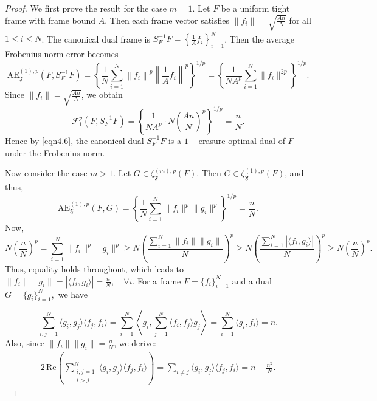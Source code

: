 \documentclass[10pt,a4paper]{amsart}
\begin{document}
   \begin{proof}
We first prove the result for the case \( m = 1 \). Let \( F \) be a uniform tight frame with frame bound \( A \). Then each frame vector satisfies \( \|f_i\| = \sqrt{\frac{An}{N}} \) for all \( 1 \leq i \leq N \). The canonical dual frame is \( S_F^{-1}F = \left\{ \frac{1}{A}f_i \right\}_{i=1}^N \). Then the average Frobenius-norm error becomes
\[
\mathrm{AE}_{\mathfrak{F}}^{(1),p}(F, S_F^{-1}F) = \left\{ \frac{1}{N} \sum_{i=1}^N \left\|f_i\right\|^p \left\|\frac{1}{A} f_i \right\|^p \right\}^{1/p} = \left\{ \frac{1}{N A^p} \sum_{i=1}^N \|f_i\|^{2p} \right\}^{1/p}.
\]
Since \( \|f_i\| = \sqrt{\frac{An}{N}} \), we obtain
\[
\mathcal{F}_1^p(F, S_F^{-1}F) = \left\{ \frac{1}{N A^p} \cdot N \left( \frac{An}{N} \right)^p \right\}^{1/p} = \frac{n}{N}.
\]
Hence by \eqref{eqn4.6}, the canonical dual $S_F^{-1}F$ is a $1-$erasure optimal dual of \( F \) under the Frobenius norm.

Now consider the case \( m > 1 \). Let \( G \in \zeta_{\mathfrak{F}}^{(m),p}(F) \). Then \( G \in \zeta_{\mathfrak{F}}^{(1),p}(F) \), and thus,
\[
\mathrm{AE}_{\mathfrak{F}}^{(1),p}(F, G)=\left\{ \frac{1}{N} \sum_{i=1}^N \|f_i\|^p \|g_i\|^p \right\}^{1/p} = \frac{n}{N}.
\]
Now,
\[
N \left(\frac{n}{N}\right)^p = \sum_{i=1}^N \|f_i\|^p \|g_i\|^p \geq N \left( \frac{\sum_{i=1}^N \|f_i\| \|g_i\|}{N} \right)^p \geq N \left( \frac{\sum_{i=1}^N |\langle f_i, g_i \rangle|}{N} \right)^p \geq N \left( \frac{n}{N} \right)^p.
\]
Thus, equality holds throughout, which leads to $\|f_i\| \|g_i\| = |\langle f_i, g_i \rangle| = \frac{n}{N}, \quad \forall i.$ For a frame $F=\{f_i\}_{i=1}^N$ and a dual $G=\{g_i\}_{i=1}^N,$ we have

\[
\sum_{i,j=1}^N \langle g_i, g_j \rangle \langle f_j, f_i \rangle = \sum_{i=1}^N \left\langle g_i, \sum_{j=1}^N \langle f_i, f_j \rangle g_j \right\rangle = \sum_{i=1}^N \langle g_i, f_i \rangle = n.
\]
Also, since \( \|f_i\| \|g_i\| = \frac{n}{N} \), we derive:
\begin{align} \label{equation3point8}
2\,\text{Re} \left( \sum_{\substack{i,j=1 \\ i > j}}^N \langle g_i, g_j \rangle \langle f_j, f_i \rangle \right) = \sum_{i \neq j} \langle g_i, g_j \rangle \langle f_j, f_i \rangle = n - \frac{n^2}{N}.
\end{align}


\end{proof}
\end{document}
